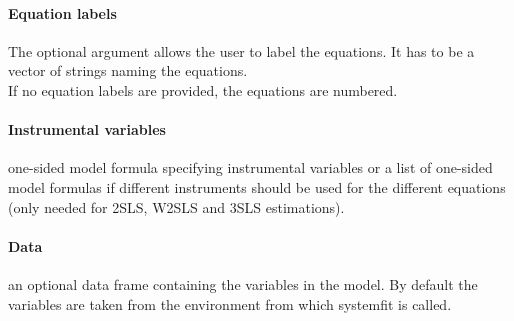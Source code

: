 \documentclass[article]{jss}
\begin{document}
\paragraph{Equation labels}
The optional argument  allows the user to label the equations.
It has to be a vector of strings naming the equations.\\
If no equation labels are provided, the equations are numbered.
 
\paragraph{Instrumental variables}   
one-sided model formula specifying instrumental variables
   or a list of one-sided model formulas if different instruments should
   be used for the different equations (only needed for 2SLS, W2SLS and
   3SLS estimations).

\paragraph{Data}   
 an optional data frame containing the variables in the model.
   By default the variables are taken from the environment from which
   systemfit is called.

\end{document}
